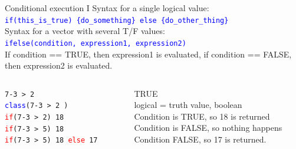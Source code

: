 \documentclass[xcolor=table,           xcolor=dvipsnames]{beamer}\usepackage[]{graphicx}\usepackage[]{color}
\newcommand{\rcode}[1]{\texttt{\textcolor{Blue}{#1}}} %
\begin{document}

\begin{frame}[fragile]{Conditional execution I}
Syntax for a single logical value:\\
\rcode{\alert{if}(this\_is\_true) \{do\_something\} \alert{else} \{do\_other\_thing\}}\\[\baselineskip]
\pause
Syntax for a vector with several T/F values:\\
\rcode{\alert{ifelse}(condition, expression1, expression2)}\\[\baselineskip]
\pause
If condition == TRUE, then expression1 is evaluated,
if condition == FALSE, then expression2 is evaluated.\\[1em]
\pause
\begin{columns}
\begin{column}{.40\textwidth}
\texttt{7-3 > 2 \\
\textcolor{blue}{class}(7-3 > 2 ) \\
\textcolor{red}{if}(7-3 > 2) 18  \\
\textcolor{red}{if}(7-3 > 5) 18  \\
\textcolor{red}{if}(7-3 > 5) 18 \textcolor{red}{else} 17 }
\end{column}
\begin{column}{.59\textwidth}
\pause TRUE\\
\pause logical = truth value, boolean\\
\pause Condition is TRUE, so 18 is returned\\
\pause Condition is FALSE, so nothing happens\\
\pause Condition FALSE, so 17 is returned.
\end{column}
\end{columns}
\end{frame}

\end{document}
